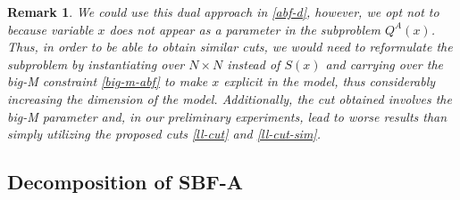 \documentclass[pdflatex,sn-mathphys-num]{sn-jnl}%
\newtheorem*{remark}{Remark}
\begin{document}
\begin{remark}
    We could use this dual approach in \ref{abf-d}, however, we opt not to because variable $x$ does not appear as a parameter in the subproblem $Q^A(x)$. Thus, in order to be able to obtain similar cuts, we would need to reformulate the subproblem by instantiating over $N \times N$ instead of $S(x)$ and carrying over the big-M constraint \eqref{big-m-abf} to make $x$ explicit in the model, thus considerably increasing the dimension of the model. Additionally, the cut obtained involves the big-M parameter and, in our preliminary experiments, lead to worse results than simply utilizing the proposed cuts \eqref{ll-cut} and \eqref{ll-cut-sim}.
\end{remark}

\subsection{Decomposition of SBF-A}
\end{document}

